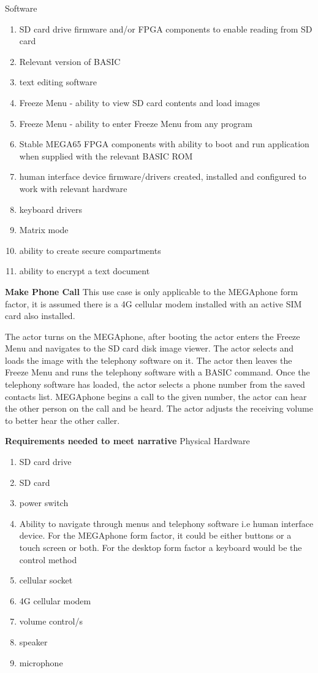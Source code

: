 Software
\begin{enumerate}
\item SD card drive firmware and/or FPGA components to enable reading from SD card
\item Relevant version of BASIC 
\item text editing software
\item Freeze Menu - ability to view SD card contents and load images
\item Freeze Menu - ability to enter Freeze Menu from any program
\item Stable MEGA65 FPGA components with ability to boot and run application when supplied with the relevant BASIC ROM
\item human interface device firmware/drivers created, installed and configured to work with relevant hardware
\item keyboard drivers
\item Matrix mode
\item ability to create secure compartments
\item ability to encrypt a text document
\end{enumerate}

\textbf{Make Phone Call}
This use case is only applicable to the MEGAphone form factor, it is assumed there is a 4G cellular modem installed with an active SIM card also installed.

The actor turns on the MEGAphone, after booting the actor enters the Freeze Menu and navigates to the SD card disk image viewer. The actor selects and loads the image with the telephony software on it. The actor then leaves the Freeze Menu and runs the telephony software with a BASIC command. Once the telephony software has loaded, the actor selects a phone number from the saved contacts list. MEGAphone begins a call to the given number, the actor can hear the other person on the call and be heard. The actor adjusts the receiving volume to better hear the other caller.

\textbf{Requirements needed to meet narrative}
Physical Hardware
\begin{enumerate}
\item SD card drive
\item SD card
\item power switch
\item Ability to navigate through menus and telephony software i.e human interface device. For the MEGAphone form factor, it could be either buttons or a touch screen or both. For the desktop form factor a keyboard would be the control method
\item cellular socket
\item 4G cellular modem
\item volume control/s
\item speaker
\item microphone
\end{enumerate}

